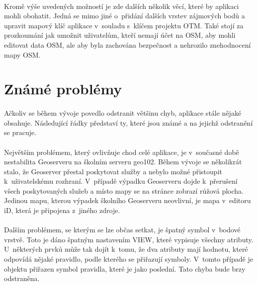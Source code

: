 \documentclass[11pt,a4paper,titlepage,oneside]{book}
\begin{document}
			\paragraph{}Kromě výše uvedených možností je zde dalších několik věcí, které by aplikaci mohli obohatit. Jedná se mimo jiné o~přidání dalších vrstev zájmových bodů a upravit mapový klíč aplikace v~souladu s~klíčem projektu \acl{OTM}. Také stojí za prozkoumání jak umožnit uživatelům, kteří nemají účet na \ac{OSM}, aby mohli editovat data \ac{OSM}, ale aby byla zachována bezpečnost a nehrozilo znehodnocení mapy \acl{OSM}.


		\section{Známé problémy}


			\paragraph{} Ačkoliv se během vývoje povedlo odstranit většinu chyb, aplikace stále nějaké obsahuje. Následující řádky představí ty, které jsou známé a na jejichž odstranění se pracuje.
			\paragraph{} Největším problémem, který ovlivňuje chod celé aplikace, je v~současné době nestabilita Geoserveru na školním serveru geo102. Během vývoje se několikrát stalo, že Geoserver přestal poskytovat služby a nebylo možné přistoupit k~uživatelskému rozhraní. V~případě výpadku Geoserveru dojde k~přerušení všech poskytovaných služeb a místo mapy se na stránce zobrazí růžová plocha. Jedinou mapu, kterou výpadek školního Geoserveru neovlivní, je mapa v~editoru iD, která je připojena z~jiného zdroje.
			\paragraph{} Dalším problémem, se kterým se lze občas setkat, je špatný symbol v~bodové vrstvě. Toto je dáno špatným nastavením VIEW, které vypisuje všechny atributy. U~některých prvků může tak dojít k~tomu, že dva atributy mají hodnotu, které odpovídá nějaké pravidlo, podle kterého se přiřazují symboly. V~tomto případě je objektu přiřazen symbol pravidla, které je jako poslední. Tato chyba bude brzy odstraněna.
\end{document}
